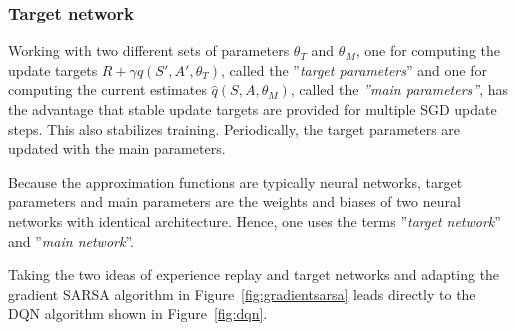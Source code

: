 \subsubsection*{Target network}

Working with two different sets of parameters $\theta_T$ and $\theta_M$, one for computing the update targets $R + \gamma \hat{q}(S', A', \theta_T)$, called the ''\emph{target parameters}'' and one for computing the current estimates $\hat{q}(S, A, \theta_M)$, called the \emph{''main parameters''}, has the advantage that stable update targets are provided for multiple SGD update steps. This also stabilizes training. Periodically, the target parameters are updated with the main parameters.

Because the approximation functions are typically neural networks, target parameters and main parameters are the weights and biases of two neural networks with identical architecture. Hence, one uses the terms ''\emph{target network}'' and ''\emph{main network}''.

Taking the two ideas of experience replay and target networks and adapting the gradient SARSA algorithm in Figure~\ref{fig:gradientsarsa} leads directly to the DQN algorithm shown in Figure~\ref{fig:dqn}.

